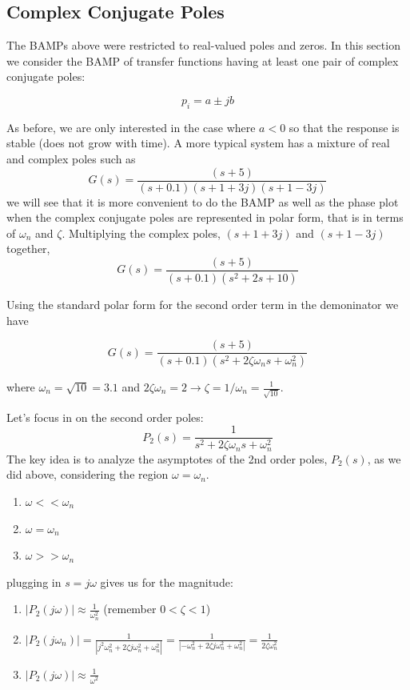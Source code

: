\subsection{Complex Conjugate Poles}

The BAMPs above were restricted to real-valued poles and zeros.  In this section we consider the BAMP of transfer functions having at least one pair of complex conjugate poles:

\[
p_i = a \pm jb
\]

As before, we are only interested in the case where $a<0$ so that the response is stable (does not grow with time).  A more typical system has a mixture of real and complex poles such as
\[
G(s) =  \frac {(s+5)} {(s+0.1)(s+1+3j)(s+1-3j)}
\]
we will see that it is more convenient to do the BAMP as well as the phase plot when the complex conjugate poles are represented in polar form, that is in terms of $\omega_n$ and $\zeta$.  Multiplying the complex poles,
$(s+1+3j)$ and $(s+1-3j)$ together,
\[
G(s) = \frac  {(s+5)}  {(s+0.1) (s^2 + 2s + 10 )  }
\]

Using the standard polar form for the second order term in the demoninator we have

\[
G(s) = \frac  {(s+5)}  {(s+0.1) (s^2 + 2\zeta\omega_n s + \omega_n^2)}
\]

where $\omega_n = \sqrt{10} = 3.1$ and $2\zeta\omega_n = 2 \to \zeta = 1/\omega_n = \frac{1}{\sqrt{10}} $.

Let's focus in on the second order poles:
\[
P_2(s) =   \frac {1}{s^2 + 2\zeta\omega_n s + \omega_n^2 }
\]
The key idea is to analyze the asymptotes of the 2nd order poles, $P_2(s)$, as we did above,  considering the region $\omega = \omega_n$.

\begin{enumerate}
  \item $\omega << \omega_n$
  \item $\omega =  \omega_n$
  \item $\omega >> \omega_n$
\end{enumerate}

plugging in $s=j\omega$  gives us for the magnitude:

\begin{enumerate}
  \item $|P_2(j\omega)| \approx \frac {1}{\omega_n^2}$ (remember $0< \zeta < 1$)
  \item $|P_2(j\omega_n)| = \frac  {1}{|j^2\omega_n^2 + 2\zeta j \omega_n^2 + \omega_n^2|}  =
                               \frac{1}{|-\omega_n^2 + 2\zeta j \omega_n^2 + \omega_n^2|} =
                               \frac{1}{2\zeta \omega_n^2}$
  \item $|P_2(j\omega)| \approx \frac {1}{\omega^2}$
\end{enumerate}

